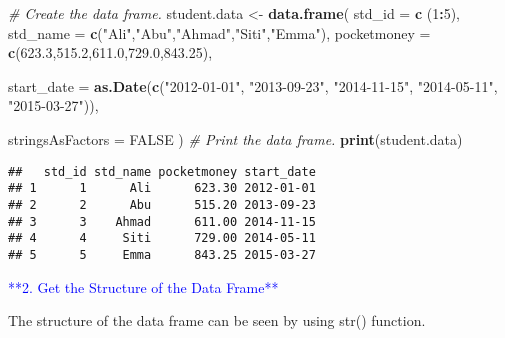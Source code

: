 \documentclass[
]{article}
\newenvironment{Shaded}{\begin{snugshade}}{\end{snugshade}}
\newcommand{\AttributeTok}[1]{\textcolor[rgb]{0.13,0.29,0.53}{#1}}
\newcommand{\CommentTok}[1]{\textcolor[rgb]{0.56,0.35,0.01}{\textit{#1}}}
\newcommand{\ConstantTok}[1]{\textcolor[rgb]{0.56,0.35,0.01}{#1}}
\newcommand{\DecValTok}[1]{\textcolor[rgb]{0.00,0.00,0.81}{#1}}
\newcommand{\FloatTok}[1]{\textcolor[rgb]{0.00,0.00,0.81}{#1}}
\newcommand{\FunctionTok}[1]{\textcolor[rgb]{0.13,0.29,0.53}{\textbf{#1}}}
\newcommand{\NormalTok}[1]{#1}
\newcommand{\OtherTok}[1]{\textcolor[rgb]{0.56,0.35,0.01}{#1}}
\newcommand{\SpecialCharTok}[1]{\textcolor[rgb]{0.81,0.36,0.00}{\textbf{#1}}}
\newcommand{\StringTok}[1]{\textcolor[rgb]{0.31,0.60,0.02}{#1}}
\begin{document}
\begin{Shaded}
\begin{Highlighting}[]
\CommentTok{\# Create the data frame.}
\NormalTok{student.data }\OtherTok{\textless{}{-}} \FunctionTok{data.frame}\NormalTok{(}
   \AttributeTok{std\_id =} \FunctionTok{c}\NormalTok{ (}\DecValTok{1}\SpecialCharTok{:}\DecValTok{5}\NormalTok{), }
   \AttributeTok{std\_name =} \FunctionTok{c}\NormalTok{(}\StringTok{"Ali"}\NormalTok{,}\StringTok{"Abu"}\NormalTok{,}\StringTok{"Ahmad"}\NormalTok{,}\StringTok{"Siti"}\NormalTok{,}\StringTok{"Emma"}\NormalTok{),}
   \AttributeTok{pocketmoney =} \FunctionTok{c}\NormalTok{(}\FloatTok{623.3}\NormalTok{,}\FloatTok{515.2}\NormalTok{,}\FloatTok{611.0}\NormalTok{,}\FloatTok{729.0}\NormalTok{,}\FloatTok{843.25}\NormalTok{), }
   
   \AttributeTok{start\_date =} \FunctionTok{as.Date}\NormalTok{(}\FunctionTok{c}\NormalTok{(}\StringTok{"2012{-}01{-}01"}\NormalTok{, }\StringTok{"2013{-}09{-}23"}\NormalTok{, }\StringTok{"2014{-}11{-}15"}\NormalTok{, }\StringTok{"2014{-}05{-}11"}\NormalTok{,}
      \StringTok{"2015{-}03{-}27"}\NormalTok{)),}
  
   \AttributeTok{stringsAsFactors =} \ConstantTok{FALSE}
\NormalTok{)}
\CommentTok{\# Print the data frame.         }
\FunctionTok{print}\NormalTok{(student.data) }
\end{Highlighting}
\end{Shaded}

\begin{verbatim}
##   std_id std_name pocketmoney start_date
## 1      1      Ali      623.30 2012-01-01
## 2      2      Abu      515.20 2013-09-23
## 3      3    Ahmad      611.00 2014-11-15
## 4      4     Siti      729.00 2014-05-11
## 5      5     Emma      843.25 2015-03-27
\end{verbatim}

\textcolor{blue}{**2. Get the Structure of the Data Frame**}

The structure of the data frame can be seen by using str() function.
\end{document}
